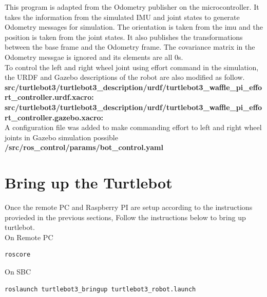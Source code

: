 \documentclass[12]{article}
\begin{document}


This program is adapted from the Odometry publisher on the microcontroller. It takes the information from the simulated IMU and joint states to generate Odometry messages
for simulation. The orientation is taken from the imu and the position is taken from the joint states. It also publishes the transformations between the
base frame and the Odometry frame. The covariance matrix in the Odometry messgae is ignored and its elements are all 0s. \\

To control the left and right wheel joint using effort command in the simulation, the URDF and Gazebo descriptions of the robot are also modified as follow. \\

\textbf{src/turtlebot3/turtlebot3\_description/urdf/turtlebot3\_waffle\_pi\_effort\_controller.urdf.xacro:} \\


\textbf{src/turtlebot3/turtlebot3\_description/urdf/turtlebot3\_waffle\_pi\_effort\_controller.gazebo.xacro:} \\



A configuration file was added to make commanding effort to left and right wheel joints in Gazebo simulation possible\\
\textbf{/src/ros\_control/params/bot\_control.yaml} \\

\newpage

\section{Bring up the Turtlebot}
Once the remote PC and Raspberry PI are setup according to the instructions provieded in the previous sections, 
Follow the instructions below to bring up turtlebot.  \\
On Remote PC
\begin{lstlisting}[style=bash]
    roscore
\end{lstlisting}
On SBC
\begin{lstlisting}[style=bash]
    roslaunch turtlebot3_bringup turtlebot3_robot.launch
\end{lstlisting}
\end{document}
